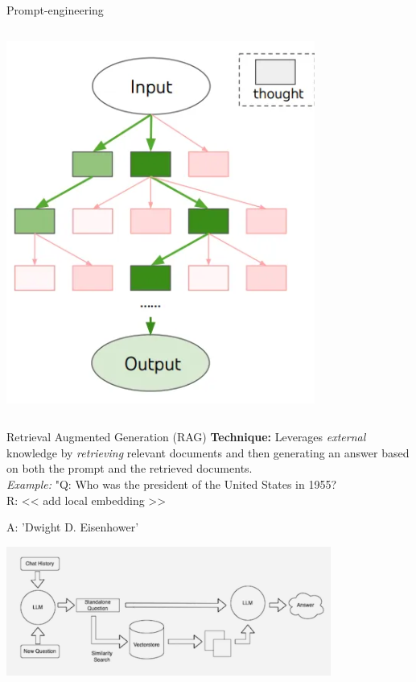 \documentclass[presentation, 10pt]{beamer}\mode<presentation>{\usetheme{AMSBolognaFC}}
\begin{document}
\begin{frame}[allowframebreaks]{Prompt-engineering}
\begin{columns}
\begin{column}{0.35\textwidth}
		\centering
		\includegraphics[width=\textwidth]{img/toc.png}	
	\end{column}
\end{columns}
\begin{exampleblock}{Retrieval Augmented Generation (RAG)}
	\textbf{Technique:} Leverages \emph{external} knowledge by \emph{retrieving} relevant documents and then generating an answer based on both the prompt and the retrieved documents. \\
	\emph{Example:} "Q: Who was the president of the United States in 1955?\\
	
	R: << add local embedding >> 
	
	A: 'Dwight D. Eisenhower'
	\end{exampleblock}
	\centering
\includegraphics[width=0.8\textwidth]{img/rag.jpg}


\end{frame}
\end{document}
